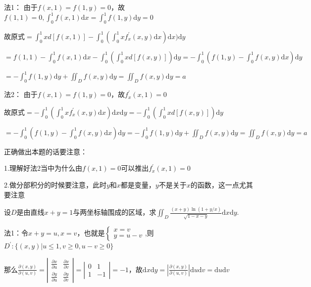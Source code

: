 \begin{xiti}
\begin{solution}
		法1：
		由于$f(x, 1)=f(1, y)=0$，故$f(1,1)=0, \int_{0}^{1} f(x, 1) \mathrm{d} x=\int_{0}^{1} f(1, y) \mathrm{d} y=0$
		
		故原式$=\int_{0}^{1} x d[f(x, 1)]-\int_{0}^{1}\left(\int_{0}^{1} x f_{x}^{\prime}(x, y) \mathrm{d}x\right) \mathrm{d}x ) \mathrm{d}y$
		
		$=f(1,1)-\int_{0}^{1} f(x, 1) \mathrm{d}x-\int_{0}^{1}\left(\int_{0}^{1} x d[f(x, y)]\right) \mathrm{d}y=-\int_{0}^{1}\left(f(1, y)-\int_{0}^{1} f(x, y) \mathrm{d}x\right) \mathrm{d}y$
		
		$=-\int_{0}^{1} f(1, y) \mathrm{d}y+\iint_{D} f(x, y) \mathrm{d}y=\iint_{D} f(x, y) \mathrm{d}y=a$
		
		法2：
		由于$f(x, 1)=f(1, y)=0$，故$f_{x}^{\prime}(x, 1) = 0$
		
		故原式$= -\int_{0}^{1}\left(\int_{0}^{1} x f_{x}^{\prime}(x, y) \mathrm{d}x\right) \mathrm{d}x  \mathrm{d}y = -\int_{0}^{1}\left(\int_{0}^{1} x d[f(x, y)]\right) \mathrm{d}y$
		
		$= -\int_{0}^{1}\left(f(1, y)-\int_{0}^{1} f(x, y) \mathrm{d}x\right) \mathrm{d}y = -\int_{0}^{1} f(1, y) \mathrm{d}y+\iint_{D} f(x, y) \mathrm{d}y=\iint_{D} f(x, y) \mathrm{d}y=a$
		
		\begin{note}
			正确做出本题的话要注意：
			
			1.理解好法2当中为什么由$f(x, 1)=0$可以推出$f_{x}^{\prime}(x, 1) = 0$
			
			2.做分部积分的时候要注意，此时$y$和$x$都是变量，$y$不是关于$x$的函数，这一点尤其要注意
		\end{note}
	\end{solution}
	\item 设$D$是由直线$x+y=1$与两坐标轴围成的区域，求$\iint_{D} \frac{(x+y) \ln (1+y / x)}{\sqrt{1-x-y}} \mathrm{d} x \mathrm{d} y$.	
	\begin{solution}
		法1：令$x+y=u, x=v$，也就是$\left\{\begin{array}{l}{x=v} \\ {y=u-v}\end{array}\right.$,则$D^{\prime} :\{(x, y) | u \leq 1, v \geq 0, u-v \geq 0\}$
		
		那么$\frac{\partial(x, y)}{\partial(u, v)}=\left| \begin{array}{ll}{\frac{\partial x}{\partial u}} & {\frac{\partial x}{\partial v}} \\ {\frac{\partial y}{\partial u}} & {\frac{\partial y}{\partial v}}\end{array}\right|=\left| \begin{array}{cc}{0} & {1} \\ {1} & {-1}\end{array}\right|=-1$，故$\mathrm{d}x \mathrm{d}y=\left|\frac{\partial(x, y)}{\partial(u, v)}\right| \mathrm{d}u \mathrm{d}v=\mathrm{d}u \mathrm{d}v$
		

\end{solution}
\end{xiti}
